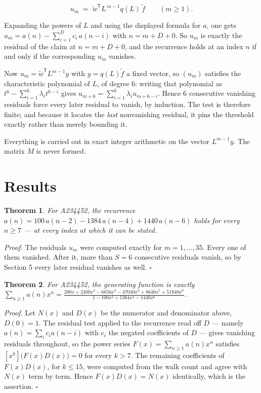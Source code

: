 \documentclass[11pt]{article}
\newtheorem{theorem}{Theorem}
\theoremstyle{definition}
\begin{document}
\[u_m \;=\; \tilde w^{\mathsf T} L^{\,m-1} q(L)\,\tilde f \qquad (m \ge 1).\]

Expanding the powers of $L$ and using the displayed formula for $a$, one gets $u_m = a(n) - \sum_{i=1}^{D} c_i\,a(n-i)$ with $n = m + D + 0$. So $u_m$ is exactly the residual of the claim at $n = m + D + 0$, and the recurrence holds at an index $n$ if and only if the corresponding $u_m$ vanishes.

Now $u_m = \tilde w^{\mathsf T} L^{m-1} y$ with $y = q(L)\tilde f$ a fixed vector, so $(u_m)$ satisfies the characteristic polynomial of $L$, of degree $6$: writing that polynomial as $t^{6} - \sum_{i=1}^{6} \lambda_i t^{6-i}$ gives $u_{m+6} = \sum_{i=1}^{6} \lambda_i u_{m+6-i}$. Hence $6$ consecutive vanishing residuals force every later residual to vanish, by induction. The test is therefore finite; and because it locates the {\itshape last} nonvanishing residual, it pins the threshold exactly rather than merely bounding it.

Everything is carried out in exact integer arithmetic on the vector $L^{m-1}y$. The matrix $M$ is never formed.

\section{Results}

\begin{theorem} For A234452, the recurrence $a(n) = 100\,a(n-2) - 1384\,a(n-4) + 1440\,a(n-6)$ holds for every $n \ge 7$ --- at every index at which it can be stated.\end{theorem}

{\itshape Proof.} The residuals $u_m$ were computed exactly for $m = 1,\dots,35$. Every one of them vanished. After it, more than $S = 6$ consecutive residuals vanish, so by Section 5 every later residual vanishes as well. $\square$

\begin{theorem} For A234452, the generating function is exactly $\sum_{n\ge 1} a(n)x^n = \frac{280x + 2400x^{2} - 6656x^{3} - 47040x^{4} + 8640x^{5} + 51840x^{6}}{1 - 100x^{2} + 1384x^{4} - 1440x^{6}}$.\end{theorem}

{\itshape Proof.} Let $N(x)$ and $D(x)$ be the numerator and denominator above, $D(0)=1$. The residual test applied to the recurrence read off $D$ --- namely $a(n) = \sum_i c_i a(n-i)$ with $c_i$ the negated coefficients of $D$ --- gives vanishing residuals throughout, so the power series $F(x)=\sum_{n\ge 1}a(n)x^n$ satisfies $[x^k]\bigl(F(x)D(x)\bigr) = 0$ for every $k > 7$. The remaining coefficients of $F(x)D(x)$, for $k \le 15$, were computed from the walk count and agree with $N(x)$ term by term. Hence $F(x)D(x) = N(x)$ identically, which is the assertion. $\square$
\end{document}
